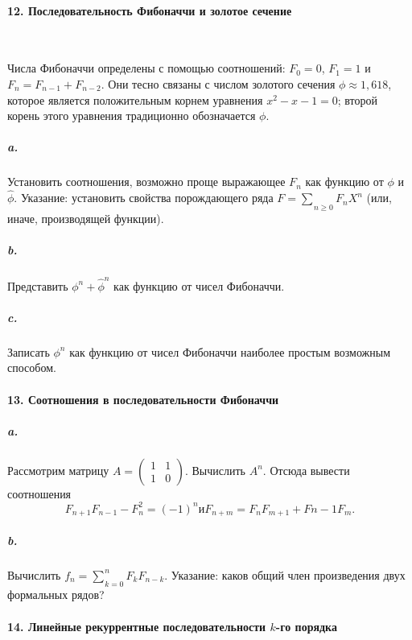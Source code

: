 \documentclass{mai_book}
\begin{document}
\paragraph { 12. Последовательность Фибоначчи и золотое сечение}\ \newline

Числа Фибоначчи определены с помощью соотношений: $F_{0}=0$, $F_{1}=1$ и $F_{n}=F_{n-1}+F_{n-2}$. Они тесно связаны с числом золотого сечения $\phi\approx{1,618}$, которое является положительным корнем уравнения $x^{2}-x-1=0$; второй корень этого уравнения традиционно обозначается  $\phi$. 

\newpage

\subparagraph { a.}Установить соотношения, возможно проще выражающее $F_{n}$ как функцию от $\phi$ и $\hat{\phi}$. Указание: установить свойства порождающего ряда 
$F={\sum_{}^{}}_{n\geq{0}}F_{n}X^{n}$ (или, иначе, производящей функции).

\subparagraph { b.}Представить $\phi^{n}+\hat{\phi}^{n}$ как функцию от чисел Фибоначчи. 

\subparagraph { c.} Записать $\phi^{n}$ как функцию от чисел Фибоначчи наиболее простым возможным способом. 

\paragraph { 13. Соотношения в последовательности Фибоначчи }

\subparagraph { a.} Рассмотрим матрицу $A=\begin{pmatrix}1 & 1 \\ 1 & 0 \end{pmatrix}$. Вычислить $A^{n}$. Отсюда вывести соотношения
\begin{equation*}
F_{n+1}F_{n-1}-F_n^2=\left({-1}\right)^{n} и F_{n+m}=F_{n}F_{m+1}+F{n-1}F_{m}.
\end{equation*}
\subparagraph { b.} Вычислить $f_{n}={\sum_{}^{}}_{k=0}^{n}F_{k}F_{n-k}$. Указание: каков общий член произведения двух формальных рядов?

\paragraph { 14. Линейные рекуррентные последовательности $k$-го порядка }
\end{document}
